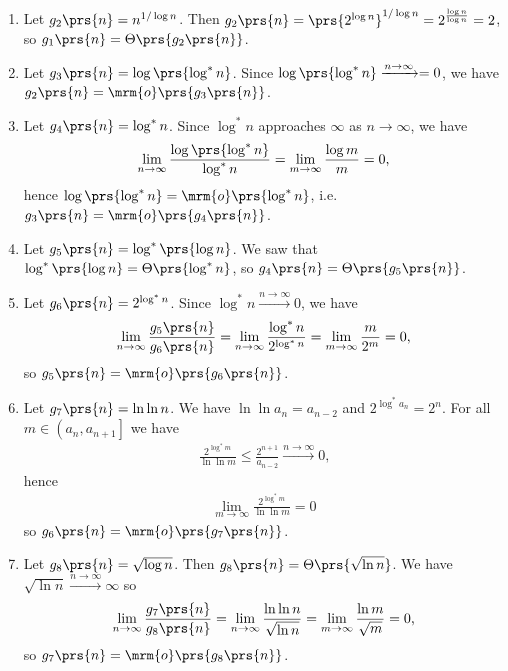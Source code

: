 \documentclass[oneside]{scrbook}
\theoremstyle{definition}
\begin{document}
\begin{problem}
\begin{enumerate}[label=\alph*.]
\begin{enumerate}[label=\arabic*.]
\item Let $g_2\prs{n} = n^{1/\log n}$. Then $g_2\prs{n} = \prs{2^{\log n}}^{1/ \log n} = 2^{\frac{\log n}{\log n}} = 2$, so $g_1\prs{n} = \Theta\prs{g_2\prs{n}}$.

\item Let $g_3\prs{n} = \log\prs{\log^* n}$. Since $\log\prs{\log^* n} \xrightarrow{n\to\infty} = 0$, we have $g_2\prs{n} = \mrm{o}\prs{g_3\prs{n}}$.

\item Let $g_4\prs{n} = \log^* n$. Since $\log^* n$ approaches $\infty$ as $n \to \infty$, we have
\begin{align*}
\lim_{n \to \infty} \frac{\log\prs{\log^* n}}{\log^* n} = \lim_{m \to \infty} \frac{\log m}{m} = 0 \text{,}
\end{align*}
hence $\log\prs{\log^* n} = \mrm{o}\prs{\log^* n}$,
i.e. $g_3\prs{n} = \mrm{o}\prs{g_4\prs{n}}$.

\item Let $g_5\prs{n} = \log^*\prs{\log n}$. We saw that $\log^*\prs{\log n} = \Theta\prs{\log^* n}$, so $g_4\prs{n} = \Theta\prs{g_5\prs{n}}$.

\item Let $g_6\prs{n} = 2^{\log^* n}$. Since $\log^* n \xrightarrow{n \to \infty} 0$, we have
\begin{align*}
\lim_{n \to \infty} \frac{g_5\prs{n}}{g_6\prs{n}} = \lim_{n\to\infty} \frac{\log^* n}{2^{\log^* n}} = \lim_{m \to \infty} \frac{m}{2^m} = 0 \text{,}
\end{align*}
so $g_5\prs{n} = \mrm{o}\prs{g_6\prs{n}}$.

\item Let $g_7\prs{n} = \ln \ln n$. We have
$\ln \ln a_n = a_{n-2}$ and $2^{\log^* a_n} = 2^n$. For all $m \in \left(a_n, a_{n+1}\right]$ we have
\begin{align*}
\frac{2^{\log^* m}}{\ln \ln m} \leq \frac{2^{n+1}}{a_{n-2}} \xrightarrow{n \to \infty} 0 \text{,}
\end{align*}
hence
\begin{align*}
\lim_{m \to \infty} \frac{2^{\log^* m}}{\ln \ln m} = 0
\end{align*}
so $g_6\prs{n} = \mrm{o}\prs{g_7\prs{n}}$.

\item Let $g_8\prs{n} = \sqrt{\log n}$. Then $g_8\prs{n} = \Theta\prs{\sqrt{\ln n}}$. We have $\sqrt{\ln n} \xrightarrow{n \to \infty} \infty$ so
\begin{align*}
\lim_{n \to \infty} \frac{g_7\prs{n}}{g_8\prs{n}} = \lim_{n\to\infty}\frac{\ln \ln n}{\sqrt{\ln n}} = \lim_{m \to \infty} \frac{\ln m}{\sqrt{m}} = 0 \text{,}
\end{align*}
so $g_7\prs{n} = \mrm{o}\prs{g_8\prs{n}}$.


\end{enumerate}
\end{enumerate}
\end{problem}
\end{document}
